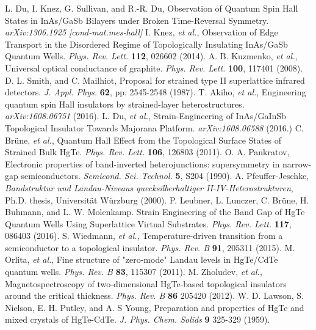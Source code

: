 \documentclass[titlepage,a4paper]{book}
\begin{document}
\begin{thebibliography}{99}
L. Du, I. Knez, G. Sullivan, and R.-R. Du, Observation of Quantum Spin Hall States in InAs/GaSb Bilayers under Broken Time-Reversal Symmetry. \textit{arXiv:1306.1925 [cond-mat.mes-hall]}
 I. Knez, \textit{et al.}, Observation of Edge Transport in the Disordered Regime of Topologically Insulating InAs/GaSb Quantum Wells. \textit{Phys. Rev. Lett.} \textbf{112}, 026602 (2014).
A. B. Kuzmenko, \textit{et al.}, Universal optical conductance of graphite. \textit{Phys. Rev. Lett.} \textbf{100}, 117401 (2008).
D. L. Smith, and C. Mailhiot, Proposal for strained type II superlattice infrared detectors. \textit{J. Appl. Phys.} \textbf{62}, pp. 2545-2548 (1987). 
T. Akiho, \textit{et al.}, Engineering quantum spin Hall insulators by strained-layer heterostructures. \textit{arXiv:1608.06751} (2016).
L. Du, \textit{et al.}, Strain-Engineering of InAs/GaInSb Topological Insulator Towards Majorana Platform. \textit{arXiv:1608.06588} (2016.)
C. Brüne, \textit{et al.}, Quantum Hall Effect from the Topological Surface States of Strained Bulk HgTe. \textit{Phys. Rev. Lett.} \textbf{106}, 126803 (2011).
O. A. Pankratov, Electronic properties of band-inverted heterojunctions: supersymmetry in narrow-gap semiconductors. \textit{Semicond. Sci. Technol.} \textbf{5}, S204 (1990).
A. Pfeuffer-Jeschke, \textit{Bandstruktur und Landau-Niveaus quecksilberhaltiger II-IV-Heterostrukturen}, Ph.D. thesis, Universität Würzburg (2000).
P. Leubner, L. Lunczer, C. Brüne, H. Buhmann, and L. W. Molenkamp. Strain Engineering of the Band Gap of HgTe Quantum Wells Using Superlattice Virtual Substrates. \textit{Phys. Rev. Lett.} \textbf{117}, 086403 (2016).
S. Wiedmann, \textit{et al.}, Temperature-driven transition from a semiconductor to a topological insulator. \textit{Phys. Rev. B} \textbf{91}, 205311 (2015).
M. Orlita, \textit{et al.}, Fine structure of "zero-mode" Landau levels in HgTe/CdTe quantum wells. \textit{Phys. Rev. B} \textbf{83}, 115307 (2011).
M. Zholudev, \textit{et al.}, Magnetospectroscopy of two-dimensional HgTe-based topological insulators around the critical thickness. \textit{Phys. Rev. B} \textbf{86} 205420 (2012).
W. D. Lawson, S. Nielson, E. H. Putley, and A. S Young, Preparation and properties of HgTe and mixed crystals of HgTe-CdTe. \textit{J. Phys. Chem. Solids} \textbf{9} 325-329 (1959).

\end{thebibliography}
\end{document}
